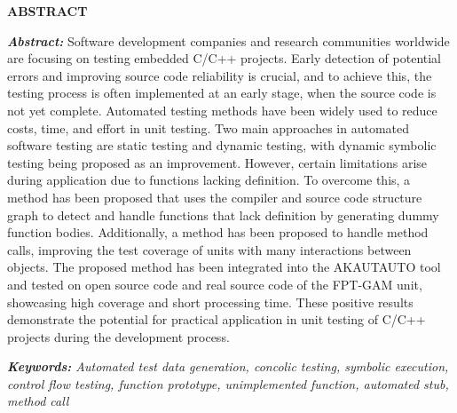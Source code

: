 \newpage
{}
\begin{center}
    \textbf{ABSTRACT}
\end{center}
\changefontsizes[16pt]{12pt}
\textit{\textbf{Abstract: }} 
Software development companies and research communities worldwide are focusing on testing embedded C/C++ projects. Early detection of potential errors and improving source code reliability is crucial, and to achieve this, the testing process is often implemented at an early stage, when the source code is not yet complete. Automated testing methods have been widely used to reduce costs, time, and effort in unit testing. Two main approaches in automated software testing are static testing and dynamic testing, with dynamic symbolic testing being proposed as an improvement. However, certain limitations arise during application due to functions lacking definition. To overcome this, a method has been proposed that uses the compiler and source code structure graph to detect and handle functions that lack definition by generating dummy function bodies. Additionally, a method has been proposed to handle method calls, improving the test coverage of units with many interactions between objects. The proposed method has been integrated into the AKAUTAUTO tool and tested on open source code and real source code of the FPT-GAM unit, showcasing high coverage and short processing time. These positive results demonstrate the potential for practical application in unit testing of C/C++ projects during the development process.

\vspace{-0.5cm}
\begin{flushleft}
  \textit{\textbf{Keywords: } Automated test data generation, concolic testing, symbolic execution, control flow testing, function prototype, unimplemented function, automated stub, method call}
\end{flushleft}
\changefontsizes[16pt]{13pt}
